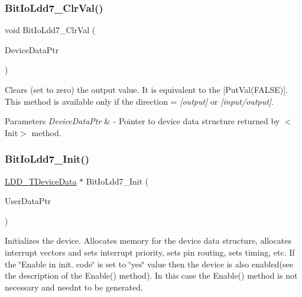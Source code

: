 \subsubsection{\texorpdfstring{Bit\+Io\+Ldd7\+\_\+\+Clr\+Val()}{BitIoLdd7\_ClrVal()}}
{\footnotesize\ttfamily void Bit\+Io\+Ldd7\+\_\+\+Clr\+Val (\begin{DoxyParamCaption}\item[{\hyperlink{group___p_e___types__module_gac5cf1362f1f0e3a2ce71b1bf2276d091}{L\+D\+D\+\_\+\+T\+Device\+Data} $\ast$}]{Device\+Data\+Ptr }\end{DoxyParamCaption})}



Clears (set to zero) the output value. It is equivalent to the \mbox{[}Put\+Val(\+F\+A\+L\+S\+E)\mbox{]}. This method is available only if the direction = {\itshape \mbox{[}output\mbox{]}} or {\itshape \mbox{[}input/output\mbox{]}}. 


\begin{DoxyParams}{Parameters}
{\em Device\+Data\+Ptr} & -\/ Pointer to device data structure returned by $<$\+Init$>$ method. \\
\hline
\end{DoxyParams}
\mbox{\label{group___bit_io_ldd7__module_gaa210933c93b15395117454a2a398c7fc}} 
\subsubsection{\texorpdfstring{Bit\+Io\+Ldd7\+\_\+\+Init()}{BitIoLdd7\_Init()}}
{\footnotesize\ttfamily \hyperlink{group___p_e___types__module_gac5cf1362f1f0e3a2ce71b1bf2276d091}{L\+D\+D\+\_\+\+T\+Device\+Data} $\ast$ Bit\+Io\+Ldd7\+\_\+\+Init (\begin{DoxyParamCaption}\item[{\hyperlink{group___p_e___types__module_ga0b66a73f87238a782318aa0be7578e35}{L\+D\+D\+\_\+\+T\+User\+Data} $\ast$}]{User\+Data\+Ptr }\end{DoxyParamCaption})}



Initializes the device. Allocates memory for the device data structure, allocates interrupt vectors and sets interrupt priority, sets pin routing, sets timing, etc. If the \char`\"{}\+Enable
    in init. code\char`\"{} is set to \char`\"{}yes\char`\"{} value then the device is also enabled(see the description of the Enable() method). In this case the Enable() method is not necessary and needn\textquotesingle{}t to be generated. 


